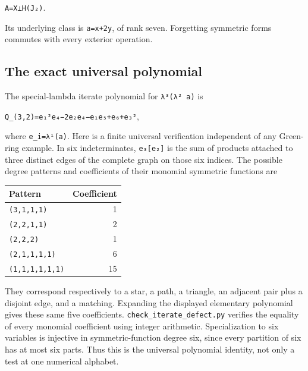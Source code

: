 \documentclass[
  10pt,
]{article}
\begin{document}
\texttt{\small A=\allowbreak{}X⊥H(\allowbreak{}J₂)\allowbreak{}}.

Its underlying class is
\texttt{\small a=\allowbreak{}x+\allowbreak{}2y}, of rank seven.
Forgetting symmetric forms commutes with every exterior operation.

\subsection{The exact universal
polynomial}\label{the-exact-universal-polynomial}

The special-lambda iterate polynomial for
\texttt{\small λ³(\allowbreak{}λ² a)\allowbreak{}} is

\texttt{\small Q\_\allowbreak{}(\allowbreak{}3,\allowbreak{}2)\allowbreak{}=\allowbreak{}e₁²e₄−2e₂e₄−e₁e₅+\allowbreak{}e₆+\allowbreak{}e₃²},

where
\texttt{\small e\_\allowbreak{}i=\allowbreak{}λⁱ(\allowbreak{}a)\allowbreak{}}.
Here is a finite universal verification independent of any Green-ring
example. In six indeterminates,
\texttt{\small e₃[\allowbreak{}e₂]\allowbreak{}} is the sum of products
attached to three distinct edges of the complete graph on those six
indices. The possible degree patterns and coefficients of their monomial
symmetric functions are

\begin{longtable}[]{@{}lr@{}}
\toprule\noalign{}
Pattern & Coefficient \\
\midrule\noalign{}
\endhead
\bottomrule\noalign{}
\endlastfoot
\texttt{\small (\allowbreak{}3,\allowbreak{}1,\allowbreak{}1,\allowbreak{}1)\allowbreak{}}
& 1 \\
\texttt{\small (\allowbreak{}2,\allowbreak{}2,\allowbreak{}1,\allowbreak{}1)\allowbreak{}}
& 2 \\
\texttt{\small (\allowbreak{}2,\allowbreak{}2,\allowbreak{}2)\allowbreak{}}
& 1 \\
\texttt{\small (\allowbreak{}2,\allowbreak{}1,\allowbreak{}1,\allowbreak{}1,\allowbreak{}1)\allowbreak{}}
& 6 \\
\texttt{\small (\allowbreak{}1,\allowbreak{}1,\allowbreak{}1,\allowbreak{}1,\allowbreak{}1,\allowbreak{}1)\allowbreak{}}
& 15 \\
\end{longtable}

They correspond respectively to a star, a path, a triangle, an adjacent
pair plus a disjoint edge, and a matching. Expanding the displayed
elementary polynomial gives these same five coefficients.
\texttt{\small check\_\allowbreak{}iterate\_\allowbreak{}defect.py}
verifies the equality of every monomial coefficient using integer
arithmetic. Specialization to six variables is injective in
symmetric-function degree six, since every partition of six has at most
six parts. Thus this is the universal polynomial identity, not only a
test at one numerical alphabet.
\end{document}
